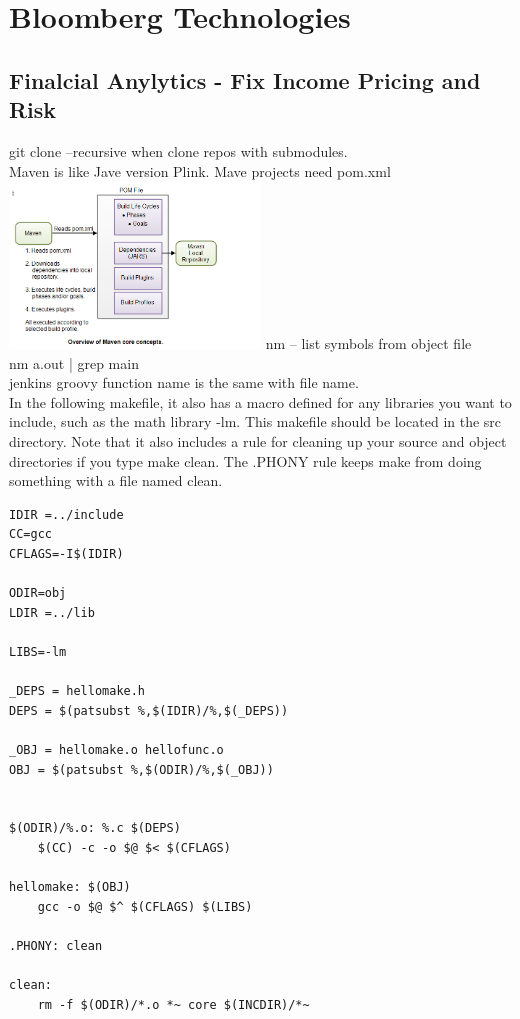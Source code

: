 \section{Bloomberg Technologies}
\subsection{Finalcial Anylytics - Fix Income Pricing and Risk}
git clone --recursive when clone repos with submodules.\\
Maven is like Jave version Plink. Mave projects need pom.xml
\includegraphics[width=0.5\textwidth]{pics/maven}
nm -- list symbols from object file \\
nm a.out | grep main\\
jenkins groovy function name is the same with file name.\\
In the following makefile, it also has a macro defined for any libraries you want to include, such as the math library -lm. This makefile should be located in the src directory. Note that it also includes a rule for cleaning up your source and object directories if you type make clean. The .PHONY rule keeps make from doing something with a file named clean.
\begin{lstlisting}
IDIR =../include
CC=gcc
CFLAGS=-I$(IDIR)

ODIR=obj
LDIR =../lib

LIBS=-lm

_DEPS = hellomake.h
DEPS = $(patsubst %,$(IDIR)/%,$(_DEPS))

_OBJ = hellomake.o hellofunc.o
OBJ = $(patsubst %,$(ODIR)/%,$(_OBJ))


$(ODIR)/%.o: %.c $(DEPS)
	$(CC) -c -o $@ $< $(CFLAGS)

hellomake: $(OBJ)
	gcc -o $@ $^ $(CFLAGS) $(LIBS)

.PHONY: clean

clean:
	rm -f $(ODIR)/*.o *~ core $(INCDIR)/*~
\end{lstlisting}

